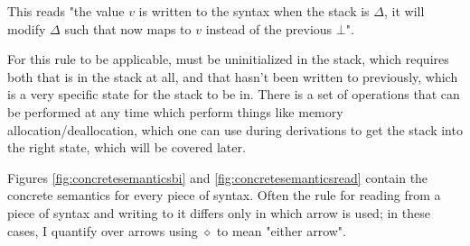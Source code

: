 \documentclass[12pt,twoside]{report}
\begin{document}
This reads "the value $v$ is written to the syntax  when the stack is $\Delta$, it will modify $\Delta$ such that  now maps to $v$ instead of the previous $\bot$".

For this rule to be applicable,  must be uninitialized in the stack, which requires both that  is in the stack at all, and that  hasn't been written to previously, which is a very specific state for the stack to be in. There is a set of operations that can be performed at any time which perform things like memory allocation/deallocation, which one can use during derivations to get the stack into the right state, which will be covered later.

Figures \ref{fig:concretesemanticsbi} and \ref{fig:concretesemanticsread} contain the concrete semantics for every piece of syntax. Often the rule for reading from a piece of syntax and writing to it differs only in which arrow is used; in these cases, I quantify over arrows using $\diamond$ to mean "either arrow".
\end{document}
